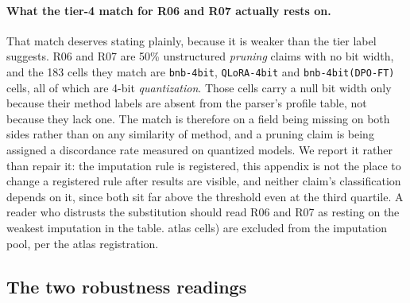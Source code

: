 \paragraph{What the tier-4 match for R06 and R07 actually rests on.} That match
deserves stating plainly, because it is weaker than the tier label suggests.
R06 and R07 are 50\% unstructured \emph{pruning} claims with no bit width, and
the 183 cells they match are \texttt{bnb-4bit}, \texttt{QLoRA-4bit} and
\texttt{bnb-4bit(DPO-FT)} cells, all of which are 4-bit \emph{quantization}.
Those cells carry a null bit width only because their method labels are absent
from the parser's profile table, not because they lack one. The match is
therefore on a field being missing on both sides rather than on any similarity
of method, and a pruning claim is being assigned a discordance rate measured on
quantized models. We report it rather than repair it: the imputation rule is
registered, this appendix is not the place to change a registered rule after
results are visible, and neither claim's classification depends on it, since
both sit far above the threshold even at the third quartile. A reader who
distrusts the substitution should read R06 and R07 as resting on the weakest
imputation in the table.
atlas cells) are excluded from the imputation pool, per the atlas registration.

\subsection{The two robustness readings}
\label{app:audit:robustness}


